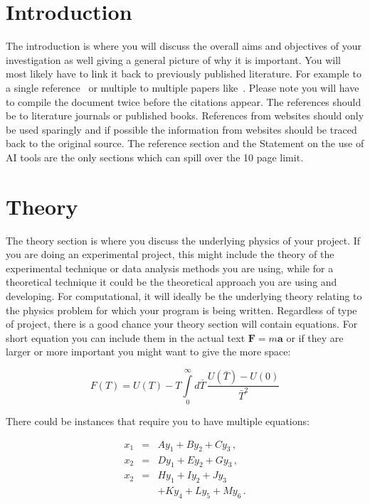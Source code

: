 \documentclass[a4paper,12pt, notitlepage]{article}
\begin{document}
\section{Introduction}
The introduction is where you will discuss the overall aims and objectives of your investigation as well giving a general picture of why it is important. You will most likely have to link it back to previously published literature. For example to a single reference~\cite{Paper_1} or multiple to multiple papers like~\cite{Paper_1, Paper_2, Paper_3}. Please note you will have to compile the document twice before the citations appear. The references should be to literature journals or published books. References from websites should only be used sparingly and if possible the information from websites should be traced back to the original source. The reference section and the Statement on the use of AI tools are the only sections which can spill over the 10 page limit\cite{Paper_4}.


\section{Theory}
The theory section is where you discuss the underlying physics of your project. If you are doing an experimental project, this might include the theory of the experimental technique or data analysis methods you are using, while for a theoretical technique it could be the theoretical approach you are using and developing. For computational, it will ideally be the underlying theory relating to the physics problem for which your program is being written. Regardless of type of project, there is a good chance your theory section will contain equations. For short equation you can include them in the actual text $\mathbf{F} = m\mathbf{a}$ or if they are larger or more important you might want to give the more space:

\begin{equation}
F(T) = U(T) - T \int\limits_0^\infty d \bar{T} \, \frac{U(\bar{T}) - U(0)}{\bar{T}^2}
\label{equation1}
\end{equation}

There could be instances that require you to have multiple equations:

\begin{eqnarray}
x_1 &=& A y_1 + B y_2 + C y_3    \,, \\
x_2 &=& D y_1 + E y_2 + G y_3    \,, \\ 
x_2 &=& H y_1 + I y_2 + J y_3    \nonumber\\
    &~& + K y_4 + L y_5 + M y_6  \,. 
\label{eq: eq_2}
\end{eqnarray}
\end{document}
